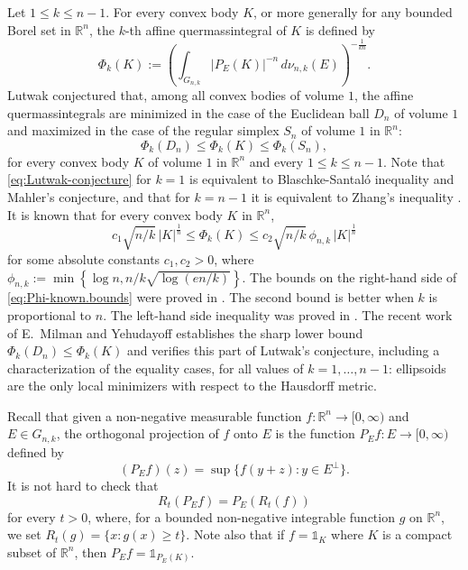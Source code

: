 \documentclass[11pt,leqno]{article}
\theoremstyle{definition}
\theoremstyle{remark}
\numberwithin{equation}{section}
\newcommand{\ls}{\leqslant}
\newcommand{\gr}{\geqslant}
\newcommand{\1}{\textbf{1}}
\begin{document}
Let $1\ls k\ls n-1$. For every convex body $K$, or more generally for any bounded Borel set in $\mathbb{R}^n$, the $k$-th affine quermassintegral of $K$ is defined by
$$\Phi_k(K) := \left( \int_{G_{n,k}} |P_E(K)|^{-n} \,d\nu_{n,k}(E) \right)^{-\frac{1}{kn}}.$$
Lutwak \cite{Lutwak-1988b} conjectured that, among all convex bodies of volume $1$, the affine quermassintegrals are minimized in the case of the Euclidean ball $D_n$ of volume $1$ and maximized in the case of the regular simplex $S_n$ of volume $1$ in ${\mathbb R}^n$:
\begin{equation}\label{eq:Lutwak-conjecture}
 \Phi_k(D_n) \ls \Phi_k(K) \ls \Phi_k(S_n),
\end{equation}
for every convex body $K$ of volume $1$ in ${\mathbb R}^n$ and every
$1\ls k \ls n-1$. Note that \eqref{eq:Lutwak-conjecture} for $k=1$ is equivalent to
Blaschke-Santal\'{o} inequality and Mahler's conjecture, and that for $k=n-1$ it is equivalent to
Zhang's inequality \cite{Zhang-1991}. It is known that for every convex body $K$ in $\mathbb{R}^n$,
\begin{equation}\label{eq:Phi-known.bounds}
c_1 \sqrt{n/k}\,|K|^{\frac{1}{n}}\ls \Phi_k(K) \ls c_2\sqrt{n/k}\,\phi_{n,k}\,|K|^{\frac{1}{n}}
\end{equation}
for some absolute constants $c_1,c_2>0$, where $\phi_{n,k}:=\min\left\{\log n , n/k\sqrt{\log(en/k)}\right\}$.
The bounds on the right-hand side of \eqref{eq:Phi-known.bounds} were proved in \cite{DP-Phi}.
The second bound is better when $k$ is proportional to $n$. The left-hand side inequality was proved in \cite{PP-small-ball}.
The recent work of E.~Milman and Yehudayoff \cite{EMilman-Yehudayoff}
establishes the sharp lower bound $\Phi_k(D_n) \ls \Phi_k(K)$
and verifies this part of Lutwak's conjecture, including a characterization of the equality cases,
for all values of $k=1,\ldots ,n-1$: ellipsoids are the only local minimizers with respect to the Hausdorff metric.

Recall that given a non-negative measurable function $f:{\mathbb R}^n\to [0,\infty)$ and $E\in G_{n,k}$, the orthogonal
projection of $f$ onto $E$ is the function $P_Ef:E\to [0,\infty)$ defined by
$$(P_Ef)(z)=\sup\{f(y+z):y\in E^{\perp}\}.$$
It is not hard to check that
$$R_t(P_Ef)=P_E(R_t(f))$$
for every $t>0$, where, for a bounded non-negative integrable function $g$ on ${\mathbb R}^n$, we set
$R_t(g)=\{x:g(x)\gr t\}$. Note also that if $f=\mathds{1}_K$ where $K$ is a compact subset of ${\mathbb R}^n$, then $P_Ef=\mathds{1}_{P_E(K)}$.
\end{document}
